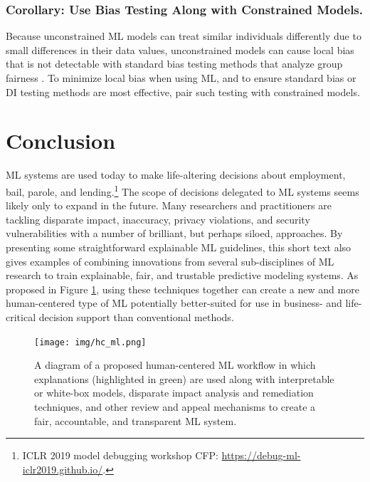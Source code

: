 \documentclass{article}
\begin{document}
\subsubsection{Corollary: Use Bias Testing Along with Constrained Models.} Because unconstrained ML models can treat similar individuals differently due to small differences in their data values, unconstrained models can cause local bias that is not detectable with standard bias testing methods that analyze group fairness \cite{dwork2012fairness}. To minimize local bias when using ML, and to ensure standard bias or DI testing methods are most effective, pair such testing with constrained models.

\section{Conclusion} \label{sec:conclusion}

ML systems are used today to make life-altering decisions about employment, bail, parole, and lending.\footnote{ICLR 2019 model debugging workshop CFP: \url{https://debug-ml-iclr2019.github.io/}.} The scope of decisions delegated to ML systems seems likely only to expand in the future. Many researchers and practitioners are tackling disparate impact, inaccuracy, privacy violations, and security vulnerabilities with a number of brilliant, but perhaps siloed, approaches. By presenting some straightforward explainable ML guidelines, this short text also gives examples of combining innovations from several sub-disciplines of ML research to train explainable, fair, and trustable predictive modeling systems. As proposed in Figure \ref{fig:hc_ml}, using these techniques together can create a new and more human-centered type of ML potentially better-suited for use in business- and life-critical decision support than conventional methods.\\

\vspace{150pt}

\begin{figure}[htb!]
	\begin{center}
		\texttt{[image: img/hc\_ml.png]}
		\caption{A diagram of a proposed human-centered ML workflow in which explanations (highlighted in green) are used along with interpretable or white-box models, disparate impact analysis and remediation techniques, and other review and appeal mechanisms to create a fair, accountable, and transparent ML system.}
		\label{fig:hc_ml}
	\end{center}
\end{figure}
\end{document}

